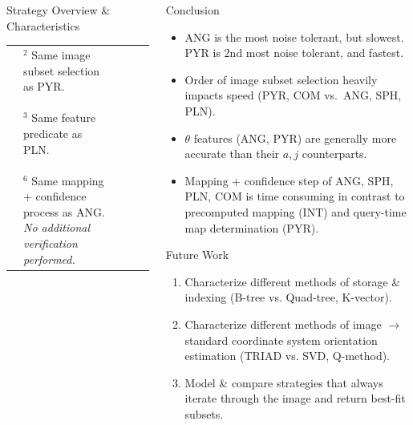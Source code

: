 \documentclass{beamer}
\newlength{\onecolwid}
\newlength{\twocolwid}
\begin{document}
\begin{frame}[t]
\begin{columns}[t]
\begin{column}{\twocolwid}
\begin{block}{Strategy Overview \& Characteristics}
\begin{table}
\begin{tabularx}{\linewidth}[t]{XXXXX}
{{%
							}}
							&
							\parbox[t]{0.95\linewidth}{\small{
								${}^2$ Same image subset selection as PYR.
								\\ \vspace*{-0.1cm} \\
								${}^3$ Same feature predicate as PLN.
								\\ \vspace*{-0.1cm} \\
								${}^{6}$ Same mapping + confidence process as ANG. \emph{No additional verification performed.}
							}}
							
						\end{tabularx}
					\end{table}
				\end{block}
			\end{column}
			
			\begin{column}{\onecolwid} %
				\begin{alertblock}{Conclusion}
					\begin{itemize}
						\setlength\itemsep{1cm}
						\item \parbox{0.95\linewidth}{
							ANG is the most noise tolerant, but slowest.	
							PYR is 2nd most noise tolerant, and fastest.
						}
						\item \parbox{0.95\linewidth}{
							Order of image subset selection heavily impacts speed (PYR, COM vs.\ ANG, SPH, PLN).
						}
						\item \parbox{0.95\linewidth}{
							$\theta$ features (ANG, PYR) are generally more accurate than their $a,j$ counterparts.
						}
						\item \parbox{0.95\linewidth}{
							Mapping + confidence step of ANG, SPH, PLN, COM is time consuming in contrast to precomputed mapping (INT) and query-time map determination (PYR).
						}
					\end{itemize}
				\end{alertblock}

				\begin{block}{Future Work}
					\begin{enumerate}
						\setlength\itemsep{1cm}
						\item \parbox{0.95\linewidth}{
							Characterize different methods of storage \& indexing (B-tree vs. Quad-tree, K-vector).
						}
						\item \parbox{0.95\linewidth}{ 
							Characterize different methods of image $\rightarrow$ standard coordinate system orientation estimation (TRIAD vs. SVD, Q-method).
						}
						\item \parbox{0.95\linewidth}{
							Model \& compare strategies that always iterate through the image and return best-fit subsets.
						}
					\end{enumerate}
				\end{block}
			

\end{column}
\end{columns}
\end{frame}
\end{document}
